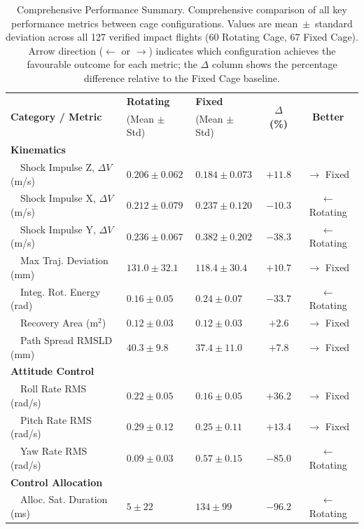 \begin{table}[h!]
\centering
\caption{Comprehensive Performance Summary. Comprehensive comparison of all key performance metrics between cage configurations. Values are mean~$\pm$~standard deviation across all 127 verified impact flights (60 Rotating Cage, 67 Fixed Cage). Arrow direction ($\leftarrow$ or $\rightarrow$) indicates which configuration achieves the favourable outcome for each metric; the $\Delta$ column shows the percentage difference relative to the Fixed Cage baseline.}
\label{tab:master_comparison}
\footnotesize
\setlength{\tabcolsep}{4pt}
\begin{tabularx}{\textwidth}{l >{\centering\arraybackslash}X >{\centering\arraybackslash}X c c}
\toprule
\multirow{2}{*}{\textbf{Category / Metric}} & \textbf{Rotating} & \textbf{Fixed} & \multirow{2}{*}{\textbf{$\Delta$ (\%)}} & \multirow{2}{*}{\textbf{Better}} \\
& \scriptsize(Mean $\pm$ Std) & \scriptsize(Mean $\pm$ Std) & & \\
\midrule
\multicolumn{5}{l}{\textbf{Kinematics}} \\
~~Shock Impulse Z, $\Delta V$ (m/s) & $0.206\pm0.062$ & $0.184\pm0.073$ & $+11.8$ & $\rightarrow$ Fixed \\
	~~Shock Impulse X, $\Delta V$ (m/s) & $0.212\pm0.079$ & $0.237\pm0.120$ & $-10.3$ & $\leftarrow$ Rotating \\
	~~Shock Impulse Y, $\Delta V$ (m/s) & $0.236\pm0.067$ & $0.382\pm0.202$ & $-38.3$ & $\leftarrow$ Rotating \\
~~Max Traj. Deviation (mm) & $131.0\pm32.1$ & $118.4\pm30.4$ & $+10.7$ & $\rightarrow$ Fixed \\
~~Integ. Rot. Energy (rad) & $0.16\pm0.05$ & $0.24\pm0.07$ & $-33.7$ & $\leftarrow$ Rotating \\
~~Recovery Area (m$^{2}$) & $0.12\pm0.03$ & $0.12\pm0.03$ & $+2.6$ & $\rightarrow$ Fixed \\
~~Path Spread RMSLD (mm) & $40.3\pm9.8$ & $37.4\pm11.0$ & $+7.8$ & $\rightarrow$ Fixed \\
\midrule
\multicolumn{5}{l}{\textbf{Attitude Control}} \\
~~Roll Rate RMS (rad/s) & $0.22\pm0.05$ & $0.16\pm0.05$ & $+36.2$ & $\rightarrow$ Fixed \\
~~Pitch Rate RMS (rad/s) & $0.29\pm0.12$ & $0.25\pm0.11$ & $+13.4$ & $\rightarrow$ Fixed \\
~~Yaw Rate RMS (rad/s) & $0.09\pm0.03$ & $0.57\pm0.15$ & $-85.0$ & $\leftarrow$ Rotating \\
\midrule
\multicolumn{5}{l}{\textbf{Control Allocation}} \\
~~Alloc. Sat. Duration (ms) & $5\pm22$ & $134\pm99$ & $-96.2$ & $\leftarrow$ Rotating \\
\midrule
\bottomrule
\end{tabularx}
\end{table}

